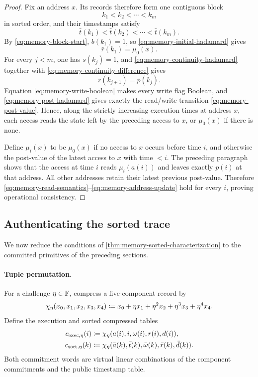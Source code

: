 \begin{proof}
Fix an address $x$.  Its records therefore form one contiguous block
\[
  k_1<k_2<\cdots<k_m
\]
in sorted order, and their timestamps satisfy
\[
  \bar t(k_1)<\bar t(k_2)<\cdots<\bar t(k_m).
\]
By \eqref{eq:memory-block-start}, $b(k_1)=1$, so \eqref{eq:memory-initial-hadamard} gives
\[
  \bar r(k_1)=\mu_0(x).
\]
For every $j<m$, one has $s(k_j)=1$, and \eqref{eq:memory-continuity-hadamard} together with \eqref{eq:memory-continuity-difference} gives
\[
  \bar r(k_{j+1})=\bar p(k_j).
\]
Equation \eqref{eq:memory-write-boolean} makes every write flag Boolean, and \eqref{eq:memory-post-hadamard} gives exactly the read/write transition \eqref{eq:memory-post-value}.  Hence, along the strictly increasing execution times at address $x$, each access reads the state left by the preceding access to $x$, or $\mu_0(x)$ if there is none.

Define $\mu_i(x)$ to be $\mu_0(x)$ if no access to $x$ occurs before time $i$, and otherwise the post-value of the latest access to $x$ with time $<i$.  The preceding paragraph shows that the access at time $i$ reads $\mu_i(a(i))$ and leaves exactly $p(i)$ at that address.  All other addresses retain their latest previous post-value.  Therefore \eqref{eq:memory-read-semantics}--\eqref{eq:memory-address-update} hold for every $i$, proving operational consistency.
\end{proof}

\subsection{Authenticating the sorted trace}
\label{sec:memory-authentication}

We now reduce the conditions of \cref{thm:memory-sorted-characterization} to the committed primitives of the preceding sections.

\paragraph{Tuple permutation.}
For a challenge $\eta\in\mathbb{F}$, compress a five-component record by
\begin{equation}
  \chi_{\eta}(x_0,x_1,x_2,x_3,x_4)
  \coloneqq
  x_0+\eta x_1+\eta^2x_2+\eta^3x_3+\eta^4x_4.
  \label{eq:memory-tuple-compression}
\end{equation}
Define the execution and sorted compressed tables
\begin{align}
  c_{\mathrm{exec},\eta}(i)
  &\coloneqq
  \chi_\eta(a(i),i,\omega(i),r(i),d(i)),
  \label{eq:memory-exec-compression}\\
  c_{\mathrm{sort},\eta}(k)
  &\coloneqq
  \chi_\eta(\bar a(k),\bar t(k),\bar\omega(k),\bar r(k),\bar d(k)).
  \label{eq:memory-sort-compression}
\end{align}
Both commitment words are virtual linear combinations of the component commitments and the public timestamp table.

